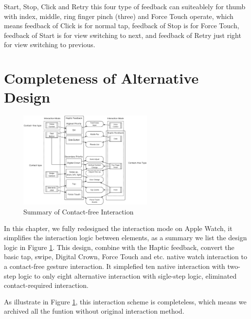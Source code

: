 Start, Stop, Click and Retry this four type of feedback can suiteablely for thumb with index, middle, ring finger pinch (three) and Force Touch operate, which means feedback of Click is for normal tap, feedback of Stop is for Force Touch, feedback of Start is for view switching to next, and feedback of Retry just right for view switching to previous.

\section{Completeness of Alternative Design}
\label{sec:completeless}

\begin{figure}[H]
    \kaishu
    \centering
    \includegraphics[width=0.6\textwidth]{figures/interaction-en}
    \caption{\kaishu Summary of Contact-free Interaction}
    \label{fig:interaction}
\end{figure}

In this chapter, we fully redesigned the interaction mode on Apple Watch, it simplifies the interaction logic between elements, as a summary we list the design logic in Figure \ref{fig:interaction}.
This design, combine with the Haptic feedback, convert the basic tap, swipe, Digital Crown, Force Touch and etc. native watch interaction to a contact-free gesture interaction. It simplefied ten native interaction with two-step logic to only eight alternative interaction with sigle-step logic, eliminated contact-required interaction.

As illustrate in Figure \ref{fig:interaction}, this interaction scheme is completeless, which means we archived all the funtion without original interaction method.

\cleardoublepage
